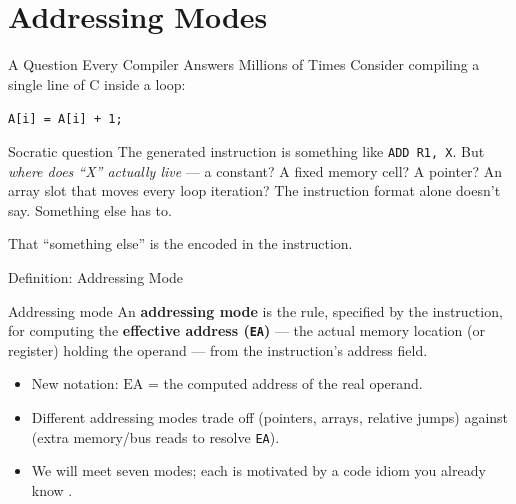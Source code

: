 \documentclass[aspectratio=169]{beamer}
\begin{document}

\section{Addressing Modes}

\begin{frame}{A Question Every Compiler Answers Millions of Times}
  Consider compiling a single line of C inside a loop:
  \begin{center}
    \texttt{A[i] = A[i] + 1;}
  \end{center}
  \begin{block}{Socratic question}
    The generated instruction is something like \texttt{ADD R1, X}. But \emph{where
    does ``X'' actually live} --- a constant? A fixed memory cell? A pointer? An
    array slot that moves every loop iteration? The instruction format alone
    doesn't say. Something else has to.
  \end{block}
  That ``something else'' is the  encoded in the instruction.
\end{frame}

\begin{frame}{Definition: Addressing Mode}
  \begin{block}{Addressing mode}
    An \textbf{addressing mode} is the rule, specified by the instruction, for
    computing the \textbf{effective address (\texttt{EA})} --- the actual memory
    location (or register) holding the operand --- from the instruction's address
    field.
  \end{block}
  \begin{itemize}
    \item New notation: $\text{EA}$ = the computed address of the real operand.
    \item Different addressing modes trade off  (pointers, arrays,
      relative jumps) against  (extra memory/bus reads to resolve \texttt{EA}).
    \item We will meet seven modes; each is motivated by a code idiom you already
      know \cite{Hamacher2002_computer_organization}.
  \end{itemize}
\end{frame}
\end{document}
